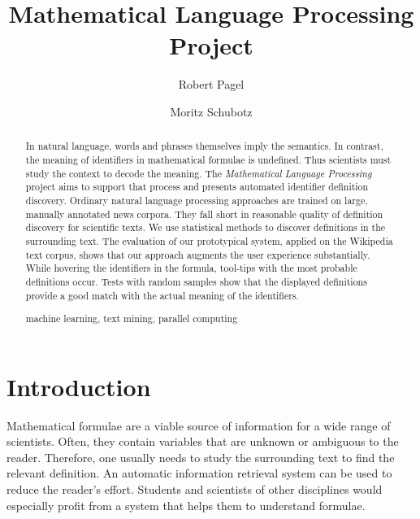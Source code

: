 \documentclass[runningheads]{llncs}
\newcommand{\keywords}[1]{\par\addvspace\baselineskip
\noindent\keywordname\enspace\ignorespaces#1}
\begin{document}
\mainmatter

\title{Mathematical Language Processing \\ Project}

\author{Robert Pagel \and Moritz Schubotz}



\maketitle


\begin{abstract}
In natural language, words and phrases themselves imply the semantics.
In contrast, the meaning of identifiers in mathematical formulae is undefined.
Thus scientists must study the context to decode the meaning.
The \emph{Mathematical Language Processing} project aims to support that process and
presents automated identifier definition discovery.
Ordinary natural language processing approaches are trained on large, manually annotated news
corpora.
They fall short in reasonable quality of definition discovery for scientific texts.
We use statistical methods to discover definitions in the surrounding text.
The evaluation of our prototypical system, applied on the Wikipedia text
corpus, shows that our approach augments the user experience
substantially.
While hovering the identifiers in the formula, tool-tips with the most probable definitions
occur.
Tests with random samples show that the displayed definitions provide
a good match with the actual meaning of the identifiers.   
\keywords{machine learning, text mining, parallel computing}
\end{abstract}


\section{Introduction}

Mathematical formulae are a viable source of information for a wide range of
scientists.
Often, they contain variables that are unknown or ambiguous to the reader.
Therefore, one usually needs to study the surrounding text to find the relevant definition.
An automatic information retrieval system can be used to reduce the reader's
effort.
Students and scientists of other disciplines would especially profit from a 
system that helps them to understand formulae.
\end{document}
